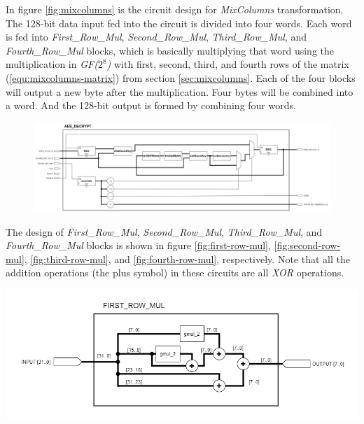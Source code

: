 \documentclass[a4paper, 10pt]{article}
\newenvironment{Figure}
    {\par\medskip\noindent\minipage{\linewidth}}
    {\endminipage\par\medskip}
\begin{document}
\begin{multicols}{2}
            In figure \ref{fig:mixcolumns} is the circuit design for \textit{MixColumns} transformation. The 128-bit data input fed into the circuit is divided into four words. Each word is fed into \textit{First\_Row\_Mul}, \textit{Second\_Row\_Mul}, \textit{Third\_Row\_Mul}, and \textit{Fourth\_Row\_Mul} blocks, which is basically multiplying that word using the multiplication in \textit{GF($2^{8}$)} with first, second, third, and fourth rows of the matrix (\ref{equ:mixcolumns-matrix}) from section \ref{sec:mixcolumns}. Each of the four blocks will output a new byte after the multiplication. Four bytes will be combined into a word. And the 128-bit output is formed by combining four words.

	\noindent
            \begin{figure}[t]
                \centering
                \includegraphics[width=\linewidth]{AES_decrypt.png}
                \label{fig:AES_decrypt}
            \end{figure}

            The design of \textit{First\_Row\_Mul}, \textit{Second\_Row\_Mul}, \textit{Third\_Row\_Mul}, and \textit{Fourth\_Row\_Mul} blocks is shown in figure \ref{fig:first-row-mul}, \ref{fig:second-row-mul}, \ref{fig:third-row-mul}, and \ref{fig:fourth-row-mul}, respectively. Note that all the addition operations (the plus symbol) in these circuits are all \textit{XOR} operations.

            \noindent
            \begin{Figure}
                \centering
                \includegraphics[width=\linewidth]{First_Row_Mul.png}
                \label{fig:first-row-mul}
            \end{Figure}


\end{multicols}
\end{document}
